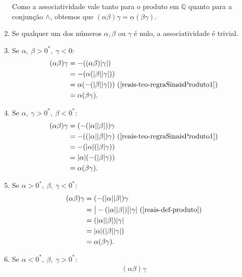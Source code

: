 \documentclass[../main.tex]{subfiles}
\begin{document}
\begin{dem}
\begin{enumerate}
            Como a associatividade vale tanto para o produto em $\mathbb{Q}$ quanto para a conjunção $\land$, obtemos que $(\alpha\beta)\gamma = \alpha(\beta\gamma)$. 
        \item Se qualquer um dos números $\alpha, \beta$ ou $\gamma$ é nulo, a associatividade é trivial.
        \item Se $\alpha,\ \beta > 0^*,\ \gamma < 0$: 
            \begin{align*}
                (\alpha\beta)\gamma &= -((\alpha\beta)\abs{\gamma}) \\
                &= -(\alpha (\abs{\beta}\abs{\gamma})) \\
                &= \alpha (-(\abs{\beta}\abs{\gamma})) \text{ (\Cref{reais-teo-regraSinaisProduto1})}\\
                &= \alpha(\beta\gamma).
            \end{align*}
        \item Se $\alpha,\ \gamma > 0^*,\ \beta < 0^*$: 
            \begin{align*}
                (\alpha\beta)\gamma &=
                (-(\abs{\alpha}\abs{\beta}))\gamma \\
                &=- ((\abs{\alpha}\abs{\beta})\gamma) \text{ (\Cref{reais-teo-regraSinaisProduto1})} \\
                &= - (\abs{\alpha}(\abs{\beta}\gamma)) \\
                &= \abs{\alpha}(-(\abs{\beta}\gamma)) \\
                &= \alpha(\beta\gamma).
            \end{align*}
        \item Se $\alpha > 0^*,\ \beta,\ \gamma < 0^*$:
            \begin{align*}
                (\alpha\beta)\gamma 
                &= (-(\abs{\alpha}\abs{\beta})\gamma \\
                &= \big|-(\abs{\alpha}\abs{\beta})\big| \abs{\gamma} \text{ (\Cref{reais-def-produto})} \\
                &= (\abs{\alpha}\abs{\beta})\abs{\gamma} \\
                &= \abs{\alpha} (\abs{\beta}\abs{\gamma}) \\
                &= \alpha(\beta\gamma).
            \end{align*}
        \item Se $\alpha < 0^*,\ \beta,\ \gamma > 0^*$:
            \begin{align*}
                 (\alpha\beta)\gamma 

\end{align*}
\end{enumerate}
\end{dem}
\end{document}
